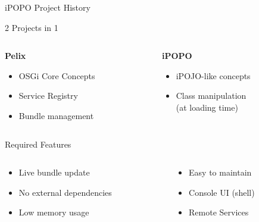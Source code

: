 \begin{frame}{iPOPO Project History}
\begin{block}{2 Projects in 1}
\begin{columns}
\begin{column}{.5\textwidth}
\vspace{-1em}
\begin{center}
\textbf{Pelix}
\vspace{-1em}
\end{center}
\begin{itemize}
\item OSGi Core Concepts
\item Service Registry
\item Bundle management
\end{itemize}
\end{column}

\begin{column}{.4\textwidth}
\vspace{-1em}
\begin{center}
\textbf{iPOPO}
\vspace{-1em}
\end{center}
\begin{itemize}
\item iPOJO-like concepts
\item Class manipulation \\ (at loading time)
\end{itemize}
\end{column}
\end{columns}
\end{block}

\begin{block}{Required Features}
\begin{columns}
\begin{column}{.5\textwidth}
\begin{itemize}
\item Live bundle update
\item No external dependencies
\item Low memory usage
\end{itemize}
\end{column}

\begin{column}{.4\textwidth}
\begin{itemize}
\item Easy to maintain
\item Console UI (shell)
\item Remote Services
\end{itemize}
\end{column}
\end{columns}
\end{block}

\end{frame}

